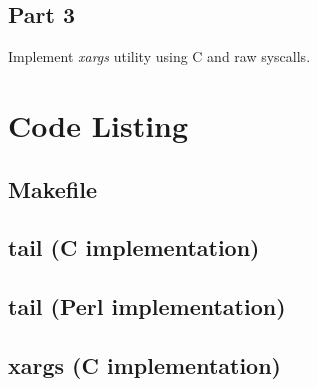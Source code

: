 \documentclass[12pt, a4paper]{article}
\begin{document}
\subsection*{Part 3}

Implement \textit{xargs} utility using C and raw syscalls.

\section*{Code Listing}

\setmonofont{Fira Mono}

\subsection*{Makefile}


\newpage
\subsection*{tail (C implementation)}


\newpage
\subsection*{tail (Perl implementation)}



\subsection*{xargs (C implementation)}


\end{document}
